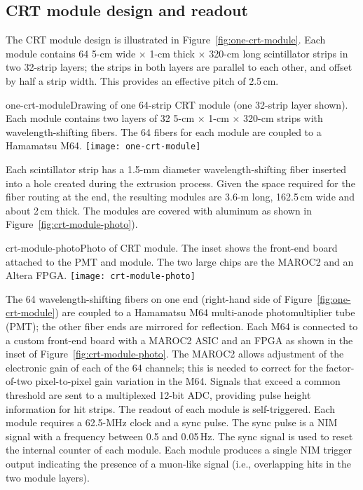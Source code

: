 \subsection{CRT module design and readout}

The CRT module design is illustrated in Figure~\ref{fig:one-crt-module}. Each module contains 64 5-cm wide $\times$ 1-cm thick $\times$ 320-cm long scintillator strips in two 32-strip layers; the strips in both layers are parallel to each other, and offset by half a strip width. This provides an effective pitch of 2.5\,cm.

\begin{cdrfigure}{one-crt-module}{Drawing of one 64-strip CRT module (one 32-strip layer shown).  Each module contains two layers of 32 5-cm $\times$ 1-cm $\times$ 320-cm strips with wavelength-shifting fibers.  The 64 fibers for each module are coupled to a Hamamatsu M64.}
  \texttt{[image: one-crt-module]}
\end{cdrfigure}


Each scintillator strip has a 1.5-mm diameter wavelength-shifting fiber inserted into a hole created during the extrusion process.   Given the space required for the fiber routing at the end, %
the resulting modules are 3.6-m long, 162.5\,cm wide and about 2\,cm thick. The modules are covered with aluminum as shown in Figure~\ref{fig:crt-module-photo}). 


\begin{cdrfigure}{crt-module-photo}{Photo of CRT module. The inset shows the front-end board attached to the PMT and module. The two large chips are the MAROC2 and an Altera FPGA.}
  \texttt{[image: crt-module-photo]}
\end{cdrfigure}


The 64 wavelength-shifting fibers on one end (right-hand side of  Figure~\ref{fig:one-crt-module})
are coupled to a Hamamatsu M64 multi-anode photomultiplier tube (PMT); the other fiber ends are mirrored for reflection. 
Each M64 is connected to a custom front-end board with a MAROC2 ASIC and an FPGA as shown in the inset of Figure~\ref{fig:crt-module-photo}.
The MAROC2 allows adjustment of the electronic gain of each of the 64 channels; this is needed to correct for the factor-of-two pixel-to-pixel gain variation in the M64.  Signals that exceed a common threshold are sent to a multiplexed 12-bit ADC, providing pulse height information for hit strips. The readout of each module is self-triggered. Each module requires a 62.5-MHz clock and a sync pulse. The sync pulse is a NIM signal with
a frequency between 0.5 and 0.05\,Hz. The sync signal is used to reset the internal counter of each module. 
Each module produces a single NIM trigger output indicating the presence of a muon-like signal (i.e., overlapping hits in the two module layers).


